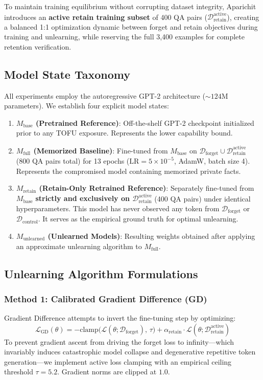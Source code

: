 \documentclass[11pt,a4paper]{article}
\begin{document}
To maintain training equilibrium without corrupting dataset integrity, Aparichit introduces an \textbf{active retain training subset} of 400 QA pairs ($\mathcal{D}_{\text{retain}}^{\text{active}}$), creating a balanced 1:1 optimization dynamic between forget and retain objectives during training and unlearning, while reserving the full 3,400 examples for complete retention verification.

\subsection{Model State Taxonomy}
All experiments employ the autoregressive GPT-2 architecture ($\sim 124$M parameters). We establish four explicit model states:
\begin{enumerate}
    \item \textbf{$M_{\text{base}}$ (Pretrained Reference)}: Off-the-shelf GPT-2 checkpoint initialized prior to any TOFU exposure. Represents the lower capability bound.
    \item \textbf{$M_{\text{full}}$ (Memorized Baseline)}: Fine-tuned from $M_{\text{base}}$ on $\mathcal{D}_{\text{forget}} \cup \mathcal{D}_{\text{retain}}^{\text{active}}$ (800 QA pairs total) for 13 epochs ($\text{LR}=5\times 10^{-5}$, AdamW, batch size 4). Represents the compromised model containing memorized private facts.
    \item \textbf{$M_{\text{retain}}$ (Retain-Only Retrained Reference)}: Separately fine-tuned from $M_{\text{base}}$ \textbf{strictly and exclusively on $\mathcal{D}_{\text{retain}}^{\text{active}}$} (400 QA pairs) under identical hyperparameters. This model has never observed any token from $\mathcal{D}_{\text{forget}}$ or $\mathcal{D}_{\text{control}}$. It serves as the empirical ground truth for optimal unlearning.
    \item \textbf{$M_{\text{unlearned}}$ (Unlearned Models)}: Resulting weights obtained after applying an approximate unlearning algorithm to $M_{\text{full}}$.
\end{enumerate}

\subsection{Unlearning Algorithm Formulations}

\subsubsection{Method 1: Calibrated Gradient Difference (GD)}
Gradient Difference attempts to invert the fine-tuning step by optimizing:
\begin{equation}
\mathcal{L}_{\text{GD}}(\theta) = -\text{clamp}\Big(\mathcal{L}(\theta; \mathcal{D}_{\text{forget}}), \, \tau\Big) + \alpha_{\text{retain}} \cdot \mathcal{L}(\theta; \mathcal{D}_{\text{retain}}^{\text{active}})
\end{equation}
To prevent gradient ascent from driving the forget loss to infinity—which invariably induces catastrophic model collapse and degenerative repetitive token generation—we implement active loss clamping with an empirical ceiling threshold $\tau = 5.2$. Gradient norms are clipped at $1.0$.
\end{document}
